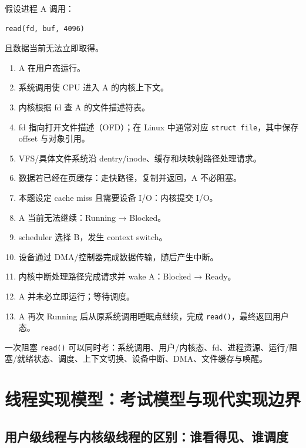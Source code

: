 \documentclass[11pt,a4paper]{ctexart}
\newcommand{\code}[1]{\texttt{#1}}
\begin{document}
假设进程 A 调用：
\begin{verbatim}
read(fd, buf, 4096)
\end{verbatim}
且数据当前无法立即取得。

\begin{enumerate}
\item A 在用户态运行。
\item 系统调用使 CPU 进入 A 的内核上下文。
\item 内核根据 fd 查 A 的文件描述符表。
\item fd 指向打开文件描述（OFD）；在 Linux 中通常对应 \code{struct file}，其中保存 offset 与对象引用。
\item VFS/具体文件系统沿 dentry/inode、缓存和块映射路径处理请求。
\item 数据若已经在页缓存：走快路径，复制并返回，A 不必阻塞。
\item 本题设定 cache miss 且需要设备 I/O：内核提交 I/O。
\item A 当前无法继续：Running → Blocked。
\item scheduler 选择 B，发生 context switch。
\item 设备通过 DMA/控制器完成数据传输，随后产生中断。
\item 内核中断处理路径完成请求并 wake A：Blocked → Ready。
\item A 并未必立即运行；等待调度。
\item A 再次 Running 后从原系统调用睡眠点继续，完成 \code{read()}，最终返回用户态。
\end{enumerate}

\begin{exam}[一题串起的考点]
一次阻塞 \code{read()} 可以同时考：系统调用、用户/内核态、fd、进程资源、运行/阻塞/就绪状态、调度、上下文切换、设备中断、DMA、文件缓存与唤醒。
\end{exam}

\section{线程实现模型：考试模型与现代实现边界}

\subsection{用户级线程与内核级线程的区别：谁看得见、谁调度}
\end{document}
